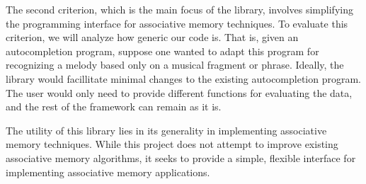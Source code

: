 \documentclass{sig-alternate}
\begin{document}
The second criterion, which is the main focus of the library, involves simplifying the programming interface for associative memory techniques.
To evaluate this criterion, we will analyze how generic our code is. That is, given an autocompletion program, suppose one wanted to adapt this 
program for recognizing a melody based only on a musical fragment or phrase. Ideally, the library would facillitate minimal changes to the existing 
autocompletion program. The user would only need to provide different functions for evaluating the data, and the rest of the framework can remain as it is. 

The utility of this library lies in its generality in implementing associative memory techniques. While this project does not attempt to improve 
existing associative memory algorithms, it seeks to provide a simple, flexible interface for implementing associative memory applications.




\end{document}
